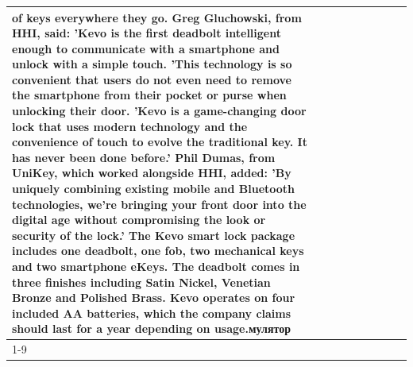 \begin{table}[H]
\begin{tabular}{lllrlllll}
of keys everywhere they go. Greg Gluchowski, from HHI, said: 'Kevo is the first deadbolt intelligent enough to communicate with a smartphone and unlock with a simple touch. 'This technology is so convenient that users do not even need to remove the smartphone from their pocket or purse when unlocking their door. 'Kevo is a game-changing door lock that uses modern technology and the convenience of touch to evolve the traditional key. It has never been done before.' Phil Dumas, from UniKey, which worked alongside HHI, added: 'By uniquely combining existing mobile and Bluetooth technologies, we’re bringing your front door into the digital age without compromising the look or security of the lock.' The Kevo smart lock package includes one deadbolt, one fob, two mechanical keys and two smartphone eKeys. The deadbolt comes in three finishes including Satin Nickel, Venetian Bronze and Polished Brass. Kevo operates on four included AA batteries, which the company claims should last for a year depending on usage.мулятор \\
\cline{1-9}

\end{tabular}
\end{table}
